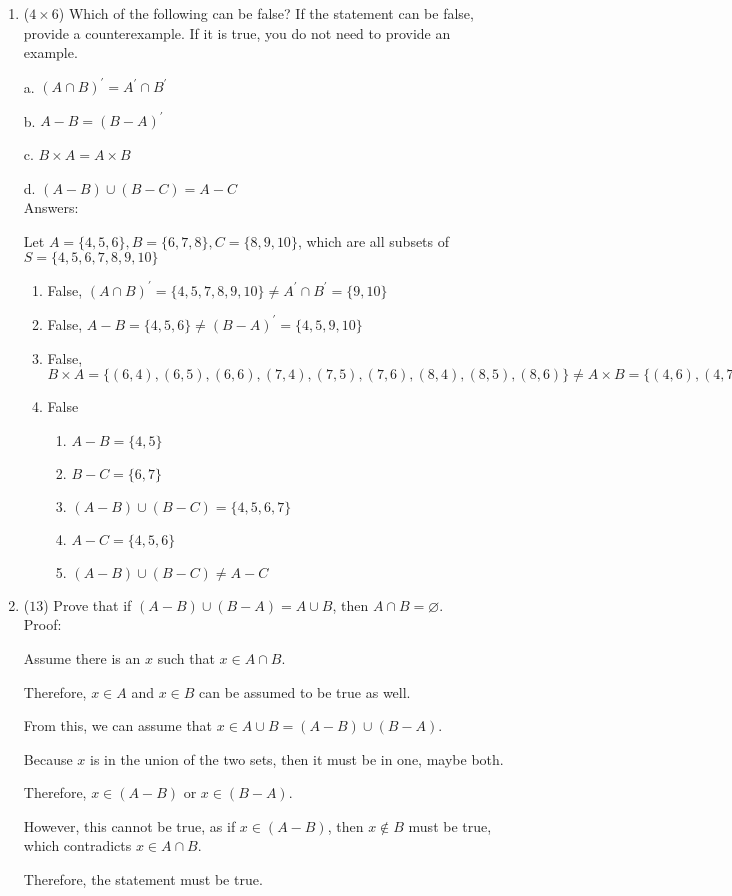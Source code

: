 \documentclass[12pt]{article}
\begin{document}
\begin{enumerate}
		\item ($4 \times 6$)
		Which of the following can be false? If the statement can be false, provide a counterexample. If it is true, you do not need to provide an example.

		a. $\left(A \cap B\right)^{\prime} = A^{\prime} \cap B^{\prime}$

		b. $A - B = \left(B - A\right)^{\prime}$

		c. $B \times A = A \times B$

		d. $\left(A - B\right) \cup \left(B - C\right) = A - C$
		\\Answers:


		Let $A = \{4, 5, 6\}, B = \{6, 7, 8\}, C = \{8, 9, 10\}$, which are all subsets of $S = \{4, 5, 6, 7, 8, 9, 10\}$
		\begin{enumerate}
			\item False, $(A \cap B)^{\prime} = \{4, 5, 7, 8, 9, 10\} \neq A^{\prime} \cap B^{\prime} = \{9, 10\}$
			\item False, $A - B = \{4, 5, 6\} \neq (B - A)^{\prime} = \{4, 5, 9, 10\}$
			\item False, $B \times A = \{(6,4), (6,5), (6,6), (7,4), (7,5), (7,6), (8,4), (8,5), (8,6)\} \neq A \times B = \{(4,6), (4,7), (4,8), (5,6), (5,7), (5,8), (6,6), (6,7), (6,8)\}$
			\item False
			\begin{enumerate}
				\item $A - B = \{4,5\}$
				\item $B - C = \{6,7\}$
				\item $(A - B) \cup (B - C) = \{4,5,6,7\}$
				\item $A - C = \{4,5,6\}$
				\item $(A - B) \cup (B - C) \neq A - C$
			\end{enumerate}
		\end{enumerate}
		\clearpage
		\item ($13$) Prove that if $\left(A - B\right) \cup \left(B - A\right) = A \cup B$, then $A \cap B = \varnothing$. \\

		Proof:

		Assume there is an $x$ such that $x \in A \cap B$.

		Therefore, $x \in A$ and $x \in B$ can be assumed to be true as well.

		From this, we can assume that $x \in A \cup B = (A - B) \cup (B - A)$.

		Because $x$ is in the union of the two sets, then it must be in one, maybe both.

		Therefore, $x \in (A - B)$ or $x \in (B - A)$.

		However, this cannot be true, as if $x \in (A - B)$, then $x \notin B$ must be true, which contradicts $x \in A \cap B$.

		Therefore, the statement must be true.
	\end{enumerate}
\end{document}
